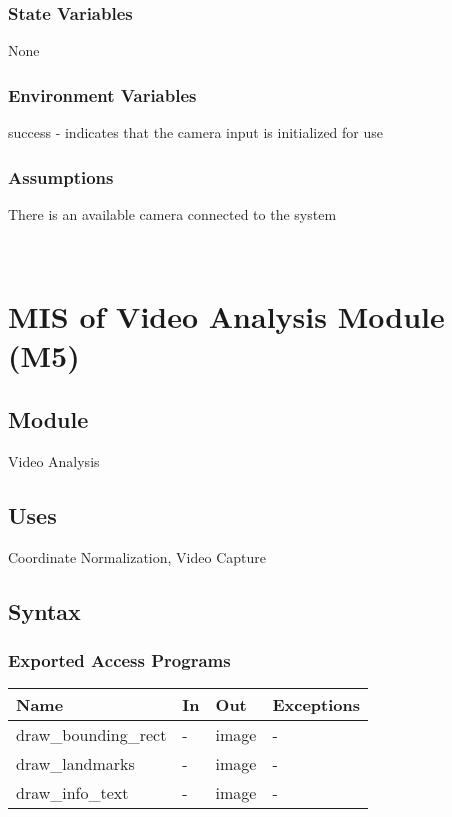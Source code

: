 \documentclass[12pt, titlepage]{article}
\begin{document}
\subsubsection{State Variables}

None

\subsubsection{Environment Variables}

success - indicates that the camera input is initialized for use

\subsubsection{Assumptions}

There is an available camera connected to the system

~\newpage

\section{MIS of Video Analysis Module (M5)} \label{m5}

\subsection{Module}

Video Analysis

\subsection{Uses}

Coordinate Normalization, Video Capture

\subsection{Syntax}

\subsubsection{Exported Access Programs}

\begin{center}
\begin{tabular}{p{5cm} p{3cm} p{3cm} p{4cm}}
\hline
\textbf{Name} & \textbf{In} & \textbf{Out} & \textbf{Exceptions} \\
\hline
draw\_bounding\_rect & - & image & - \\
draw\_landmarks & - & image & - \\
draw\_info\_text & - & image & - \\
\hline
\end{tabular}
\end{center}
\end{document}

